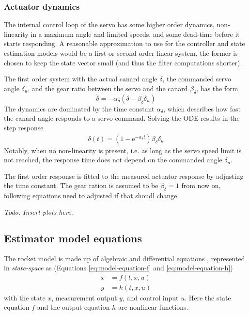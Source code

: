 \subsubsection{Actuator dynamics}
The internal control loop of the servo has some higher order dynamics, non-linearity in a maximum angle and limited speeds, and some dead-time before it starts responding.
A reasonable approximation to use for the controller and state estimation models would be a first or second order linear system, the former is chosen to keep the state vector small (and thus the filter computations shorter).

The first order system with the actual canard angle $\delta$, the commanded servo angle $\delta_u$, and the gear ratio between the servo and the canard $\beta_\delta$, has the form
\begin{equation}
    \dot \delta = -\alpha_\delta (\delta - \beta_\delta\delta_u)
\end{equation}
The dynamics are dominated by the time constant $\alpha_\delta$, which describes how fast the canard angle responds to a servo command. 
Solving the ODE results in the step response
\begin{align}
    \delta(t) = (1-\mathrm{e}^{-\alpha_\delta t}) \beta_\delta \delta_u
\end{align}
Notably, when no non-linearity is present, i.e. as long as the servo speed limit is not reached, the response time does not depend on the commanded angle $\delta_u$.

The first order response is fitted to the measured actuator response by adjusting the time constant.
The gear ration is assumed to be $\beta_\delta = 1$ from now on, following equations need to adjusted if that shoudl change. 

\textit{Todo. Insert plots here.}


\subsection{Estimator model equations}
\label{sec:model_estimator}
The rocket model is made up of algebraic and differential equations \cite{zipfel2007, lewis2008, stevens2015}, represented in \textit{state-space} as \cite{lewis2008, stevens2015} (Equations \ref{eq:model-equation-f} and \ref{eq:model-equation-h})
\begin{align}
    \dot x &= f(t, x, u) \nonumber \\  y &= h(t, x, u) \nonumber
\end{align}  
with the state $x$, measurement output $y$, and control input $u$.
Here the state equation $f$ and the output equation $h$ are nonlinear functions.


